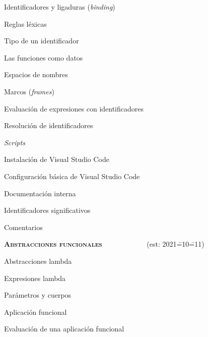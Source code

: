 \begin{longenum}
\begin{longenum}
\begin{longenum}
            \item Identificadores y ligaduras (\textit{binding})
            \begin{longenum}
                \item Reglas léxicas
                \item Tipo de un identificador
                \item Las funciones como datos
            \end{longenum}
            \item Espacios de nombres
            \item Marcos (\textit{frames})
            \item Evaluación de expresiones con identificadores
            \begin{longenum}
                \item Resolución de identificadores
            \end{longenum}
            \item \textit{Scripts}
            \item Instalación de Visual Studio Code
            \begin{longenum}
                \item Configuración básica de Visual Studio Code
            \end{longenum}
        \end{longenum}
        \item Documentación interna
        \begin{longenum}
            \item Identificadores significativos
            \item Comentarios
        \end{longenum}
    \end{longenum}
    \item \textbf{\textsc{Abstracciones funcionales}} \ \ \ \ \ \ \ \ \ \ \ \ (est: 2021\==10\==11)
    \begin{longenum}
        \item Abstracciones lambda
        \begin{longenum}
            \item Expresiones lambda
            \item Parámetros y cuerpos
            \item Aplicación funcional
            \begin{longenum}
                \item Evaluación de una aplicación funcional

\end{longenum}
\end{longenum}
\end{longenum}
\end{longenum}
